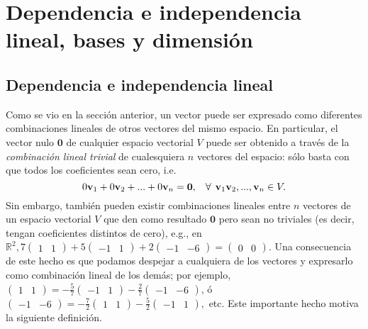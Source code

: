 \documentclass[notasLineal]{subfiles}
\begin{document}
\section{Dependencia e independencia lineal, bases y dimensión} \label{Sec: Dependencia e independencia lineal, bases y dimensión}

\subsection*{Dependencia e independencia lineal} \label{Ssec: Dependencia e independencia lineal}

Como se vio en la sección anterior, un vector puede ser expresado como diferentes combinaciones lineales de otros vectores del mismo espacio. En particular, el vector nulo $\mathbf{0}$ de cualquier espacio vectorial $V$ puede ser obtenido a través de la \emph{combinación lineal trivial} de cualesquiera $n$ vectores del espacio: sólo basta con que todos los coeficientes sean cero, i.e. $$0\mathbf{v}_1+0\mathbf{v}_2+...+0\mathbf{v}_n=\mathbf{0}, \hspace{3mm}\forall\hspace{1.5mm}\mathbf{v}_1 \mathbf{v}_2, ...,\mathbf{v}_n \in V.$$ Sin embargo, también pueden existir combinaciones lineales entre $n$ vectores de un espacio vectorial $V$ que den como resultado $\mathbf{0}$ pero sean no triviales (es decir, tengan coeficientes distintos de cero), e.g., en $\mathbb{R}^2, 7\begin{pmatrix} 1 & 1 \end{pmatrix}+5\begin{pmatrix} -1 & 1 \end{pmatrix}+2\begin{pmatrix} -1 & -6 \end{pmatrix}=\begin{pmatrix} 0 & 0 \end{pmatrix}$. Una consecuencia de este hecho es que podamos despejar a cualquiera de los vectores y expresarlo como combinación lineal de los demás; por ejemplo, $\begin{pmatrix} 1 & 1 \end{pmatrix}=-\frac{5}{7}\begin{pmatrix} -1 & 1 \end{pmatrix}-\frac{2}{7}\begin{pmatrix} -1 & -6 \end{pmatrix}$, ó $\begin{pmatrix} -1 & -6 \end{pmatrix} = -\frac{7}{2}\begin{pmatrix} 1 & 1 \end{pmatrix}-\frac{5}{2}\begin{pmatrix} -1 & 1 \end{pmatrix},$ etc. Este importante hecho motiva la siguiente definición.
\end{document}
